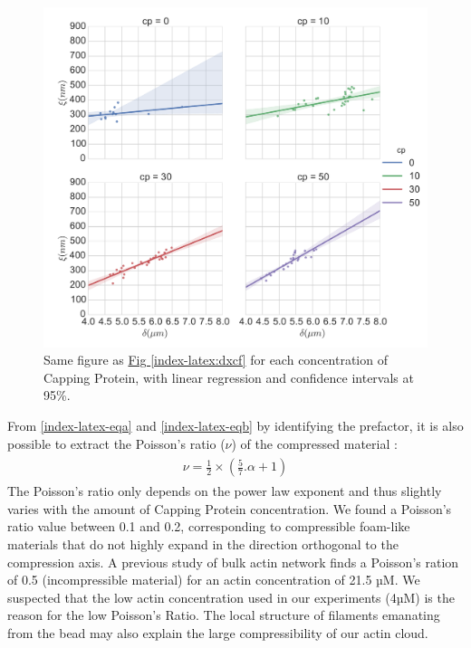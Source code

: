 \documentclass[A4paperpaper,11pt,english]{sphinxmanual}
\begin{document}
\begin{figure}[htbp]
\centering
\capstart

\includegraphics[width=1.000\linewidth]{delta-xi-facets.pdf}
\caption{Same figure as \hyperref[index-latex:dxcf]{Fig  \ref*{index-latex:dxcf}} for each concentration of Capping Protein,
with linear regression and confidence intervals at 95\%.}\label{index-latex:dxf}\end{figure}

From \eqref{index-latex-eqa} and \eqref{index-latex-eqb} by identifying the prefactor, it is also possible
to extract the Poisson’s ratio (\(\nu\)) of the compressed material :
\label{index-latex:equation-nu=f(alpha)}\begin{gather}
\begin{split}\nu =\frac 1 2 \times \left( \frac 5 7.\alpha +1\right)\end{split}\label{index-latex-nu=f(alpha)}
\end{gather}
The Poisson’s ratio only depends on the power law exponent and thus slightly varies
with the amount of Capping Protein concentration.  We found a Poisson’s ratio value between 0.1 and 0.2, corresponding to compressible
foam-like materials that do not highly expand in the direction orthogonal to
the compression axis. A previous study of bulk actin network finds a Poisson’s
ration of 0.5 (incompressible material) for an actin concentration of 21.5 µM.  We
suspected that the low actin concentration used in our experiments (4µM) is the
reason for the low Poisson’s Ratio. The local structure of filaments
emanating from the  bead may also explain the large compressibility of our actin
cloud.
\end{document}
